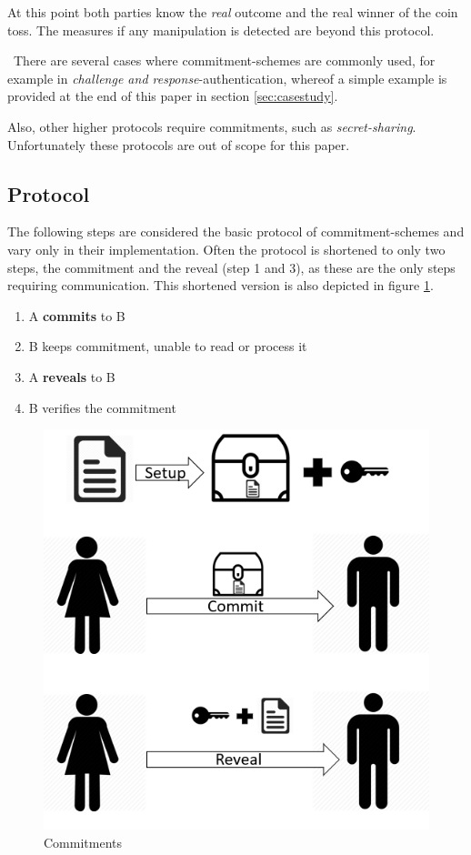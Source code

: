 \documentclass[conference]{IEEEtran}
\begin{document}
At this point both parties know the \textit{real} outcome and the real winner of the coin toss. The measures if any manipulation is detected are beyond this protocol.

~\newline There are several cases where commitment-schemes are commonly used, for example in \textit{challenge and response}-authentication, whereof a simple example is provided at the end of this paper in section \ref{sec:casestudy}.

Also, other higher protocols require commitments, such as \textit{secret-sharing}. Unfortunately these protocols are out of scope for this paper. 

\subsection{Protocol}
The following steps are considered the basic protocol of commitment-schemes and vary only in their implementation. Often the protocol is shortened to only two steps, the commitment and the reveal (step 1 and 3), as these are the only steps requiring communication. This shortened version is also depicted in figure \ref{fig:protocoll}.  
\begin{enumerate}
	\item A \textbf{commits} to B
	\item B keeps commitment, unable to read or process it
	\item A \textbf{reveals} to B
	\item B verifies the commitment 
\end{enumerate}

\begin{figure}
	\centering
	\includegraphics[width=0.8\linewidth]{Images/protocoll}
	\caption[Commitments]{Commitments}
	\label{fig:protocoll}
\end{figure}
\end{document}

